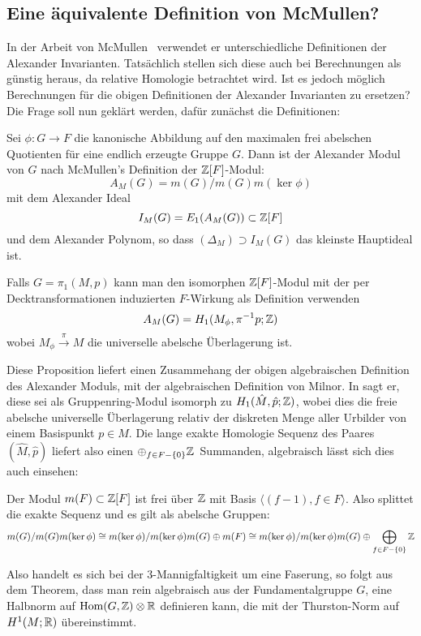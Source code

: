 \subsection{Eine äquivalente Definition von McMullen?}
    
In der Arbeit von McMullen~\cite{MCMULLEN.2002} verwendet er unterschiedliche Definitionen der Alexander Invarianten. Tatsächlich stellen sich diese auch bei Berechnungen als günstig heraus, da relative Homologie betrachtet wird. Ist es jedoch möglich Berechnungen für die obigen Definitionen der Alexander Invarianten zu ersetzen? Die Frage soll nun geklärt werden, dafür zunächst die Definitionen:

\begin{defn}
	Sei $\phi: G \to F$ die kanonische Abbildung auf den maximalen frei abelschen Quotienten für eine endlich erzeugte Gruppe $G$. Dann ist der Alexander Modul von $G$ nach McMullen's Definition der $\mathbb{Z}[F]$-Modul:
	\[
		A_M(G) = m(G)/m(G)m(\ker\phi)
	\]
	mit dem Alexander Ideal
	\[
		I_M(G) = E_1 (A_M(G)) \subset \mathbb{Z}[F]
	\]
	und dem Alexander Polynom, so dass $(\Delta_M ) \supset I_M(G)$ das kleinste Hauptideal ist.

	Falls $G=\pi_1(M,p)$ kann man den isomorphen $\mathbb{Z}[F]$-Modul mit der per Decktransformationen induzierten $F$-Wirkung als Definition verwenden 
	\[
		A_M(G)= H_1(M_\phi,\pi^{-1}p;\mathbb{Z})
	\]
	wobei $M_\phi \stackrel \pi \to M$ die universelle abelsche Überlagerung ist.
\end{defn}


	Diese Proposition liefert einen Zusammehang der obigen algebraischen Definition des Alexander Moduls, mit der algebraischen Definition von Milnor. In \cite{MCMULLEN.2002} sagt er, diese sei als Gruppenring-Modul isomorph zu $H_1(\hat M,\hat p;\mathbb{Z})$, wobei dies die freie abelsche universelle Überlagerung relativ der diskreten Menge aller Urbilder von einem Basispunkt $p \in M$. Die lange exakte Homologie Sequenz des Paares $(\hat M,\hat p)$ liefert also einen $\oplus_{f \in F - \{0\}}\mathbb{Z}$~Summanden, algebraisch lässt sich dies auch einsehen:
	\begin{prop}
	 	Der Modul $m(F)\subset \mathbb{Z}[F]$ ist frei über $\mathbb{Z}$ mit Basis $\langle (f-1),f\in F \rangle$. Also splittet die exakte Sequenz und es gilt als abelsche Gruppen:
	 	\[
	 		m(G)/m(G)m(\ker\phi) \cong m(\ker\phi)/m(\ker\phi)m(G) \oplus m(F) \cong  m(\ker\phi)/m(\ker\phi)m(G) \oplus \bigoplus_{f\in F-\{0\}} \mathbb{Z}
	 	\]
	 \end{prop} 


	 Also handelt es sich bei der 3-Mannigfaltigkeit um eine Faserung, so folgt aus dem Theorem, dass man rein algebraisch aus der Fundamentalgruppe $G$, eine Halbnorm auf $\operatorname{Hom}(G,\mathbb{Z})\otimes \mathbb{R}$ definieren kann, die mit der Thurston-Norm auf $H^1(M;\mathbb{R})$ übereinstimmt.

